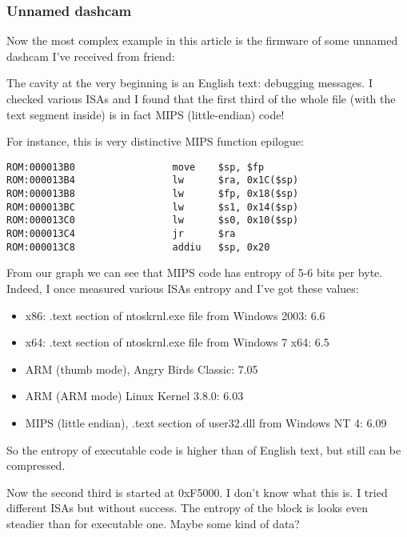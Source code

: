 \subsubsection{Unnamed dashcam}

Now the most complex example in this article is the firmware of some unnamed dashcam I've received from friend:

\begin{figure}[H]
\centering
{}
\end{figure}

The cavity at the very beginning is an English text: debugging messages.
I checked various ISAs and I found that 
the first third of the whole file (with the text segment inside) is in fact MIPS (little-endian) code!

For instance, this is very distinctive MIPS function epilogue:

\begin{lstlisting}[style=customasmMIPS]
ROM:000013B0                 move    $sp, $fp
ROM:000013B4                 lw      $ra, 0x1C($sp)
ROM:000013B8                 lw      $fp, 0x18($sp)
ROM:000013BC                 lw      $s1, 0x14($sp)
ROM:000013C0                 lw      $s0, 0x10($sp)
ROM:000013C4                 jr      $ra
ROM:000013C8                 addiu   $sp, 0x20
\end{lstlisting}

From our graph we can see that MIPS code has entropy of 5-6 bits per byte.
Indeed, I once measured various ISAs entropy and I've got these values:

\begin{itemize}
\item x86: .text section of ntoskrnl.exe file from Windows 2003: 6.6
\item x64: .text section of ntoskrnl.exe file from Windows 7 x64: 6.5
\item ARM (thumb mode), Angry Birds Classic: 7.05
\item ARM (ARM mode) Linux Kernel 3.8.0: 6.03
\item MIPS (little endian), .text section of user32.dll from Windows NT 4: 6.09
\end{itemize}

So the entropy of executable code is higher than of English text, but still can be compressed.

Now the second third is started at 0xF5000. I don't know what this is. I tried different ISAs but without success.
The entropy of the block is looks even steadier than for executable one.
Maybe some kind of data?

